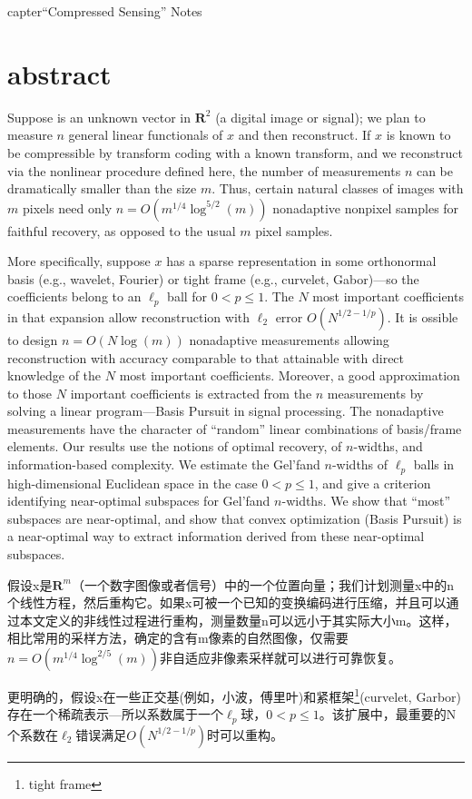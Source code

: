 capter{``Compressed Sensing'' Notes}
\label{chapter3}
\section{abstract}
Suppose is an unknown vector in $\mathbf{R}^2$ (a digital image or signal); we plan to measure $n$ general linear functionals of $x$ and then reconstruct. If $x$ is known to be compressible by transform coding with a known transform, and we reconstruct via the nonlinear procedure defined here, the number of measurements $n$ can be dramatically smaller than the size $m$. Thus, certain natural classes of images with $m$ pixels need only $n = O(m^{1/4}\log^{5/2}(m))$ nonadaptive nonpixel samples for faithful recovery, as opposed to the usual $m$ pixel samples.

More specifically, suppose $x$ has a sparse representation in some orthonormal basis (e.g., wavelet, Fourier) or tight frame (e.g., curvelet, Gabor)—so the coefficients belong to an $\ell_p$ ball for $0<p \leq 1$. The $N$ most important coefficients in that expansion allow reconstruction with $\ell_2$ error $O(N^{1/2-1/p})$. It is ossible to design \textcolor[rgb]{1,0,0}{$n=O(N\log(m))$ nonadaptive measurements} allowing reconstruction with accuracy comparable to that attainable with direct knowledge of the $N$ most important coefficients. Moreover, a good approximation to those $N$ important coefficients is extracted from the $n$ measurements by solving a linear program—Basis Pursuit in signal processing. The nonadaptive measurements have the character of “random” linear combinations of basis/frame elements. Our results use the notions of optimal recovery, of $n$-widths, and information-based complexity. We estimate the Gel'fand $n$-widths of $\ell_p$ balls in high-dimensional Euclidean space in the case $0<p \leq 1$, and give a criterion identifying near-optimal subspaces for Gel'fand $n$-widths. We show that “most” subspaces are near-optimal, and show that convex optimization (Basis Pursuit) is a near-optimal way to extract information derived from these near-optimal subspaces.

    假设x是$\mathbf{R}^m$（一个数字图像或者信号）中的一个位置向量；我们计划测量x中的n个线性方程，然后重构它。如果x可被一个已知的变换编码进行压缩，并且可以通过本文定义的非线性过程进行重构，测量数量n可以远小于其实际大小m。这样，相比常用的采样方法，确定的含有m像素的自然图像，仅需要$n=O(m^{1/4}\log^{2/5}(m))$非自适应非像素采样就可以进行可靠恢复。
	
    更明确的，假设x在一些正交基(例如，小波，傅里叶)和紧框架\footnote{tight frame}(curvelet, Garbor)存在一个稀疏表示---所以系数属于一个$\ell_p$球，$0<p\leq 1$。该扩展中，最重要的N个系数在$\ell_2$错误满足$O(N^{1/2-1/p})$时可以重构。

